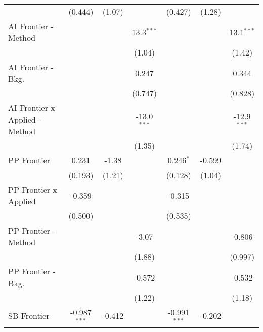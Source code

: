 \begin{tabular}{lcccccc}
                                  & (0.444)        & (1.07)        &               & (0.427)        & (1.28)        &   \\   
   AI Frontier - Method           &                &               & 13.3$^{***}$  &                &               & 13.1$^{***}$\\   
                                  &                &               & (1.04)        &                &               & (1.42)\\   
   AI Frontier - Bkg.             &                &               & 0.247         &                &               & 0.344\\   
                                  &                &               & (0.747)       &                &               & (0.828)\\   
   AI Frontier x Applied - Method &                &               & -13.0$^{***}$ &                &               & -12.9$^{***}$\\   
                                  &                &               & (1.35)        &                &               & (1.74)\\   
   PP Frontier                    & 0.231          & -1.38         &               & 0.246$^{*}$    & -0.599        &   \\   
                                  & (0.193)        & (1.21)        &               & (0.128)        & (1.04)        &   \\   
   PP Frontier x Applied          & -0.359         &               &               & -0.315         &               &   \\   
                                  & (0.500)        &               &               & (0.535)        &               &   \\   
   PP Frontier - Method           &                &               & -3.07         &                &               & -0.806\\   
                                  &                &               & (1.88)        &                &               & (0.997)\\   
   PP Frontier - Bkg.             &                &               & -0.572        &                &               & -0.532\\   
                                  &                &               & (1.22)        &                &               & (1.18)\\   
   SB Frontier                    & -0.987$^{***}$ & -0.412        &               & -0.991$^{***}$ & -0.202        &   \\   

\end{tabular}
